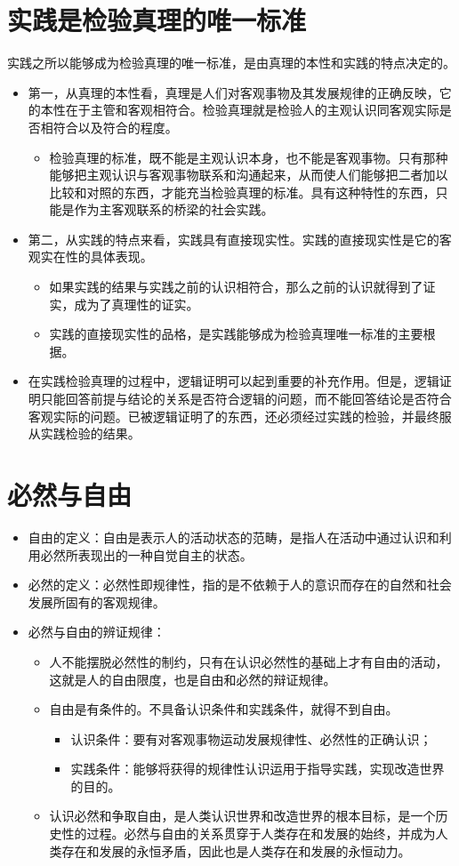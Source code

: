 \documentclass[12pt,openany]{ctexbook}
\begin{document}
\section{实践是检验真理的唯一标准}
实践之所以能够成为检验真理的唯一标准，是由真理的本性和实践的特点决定的。
\begin{itemize}
  \item 第一，从真理的本性看，真理是人们对客观事物及其发展规律的正确反映，它的本性在于主管和客观相符合。检验真理就是检验人的主观认识同客观实际是否相符合以及符合的程度。
\begin{itemize}
  \item 检验真理的标准，既不能是主观认识本身，也不能是客观事物。只有那种能够把主观认识与客观事物联系和沟通起来，从而使人们能够把二者加以比较和对照的东西，才能充当检验真理的标准。具有这种特性的东西，只能是作为主客观联系的桥梁的社会实践。
\end{itemize}
  \item 第二，从实践的特点来看，实践具有直接现实性。实践的直接现实性是它的客观实在性的具体表现。
\begin{itemize}
  \item 如果实践的结果与实践之前的认识相符合，那么之前的认识就得到了证实，成为了真理性的证实。
  \item 实践的直接现实性的品格，是实践能够成为检验真理唯一标准的主要根据。
\end{itemize}
  \item 在实践检验真理的过程中，逻辑证明可以起到重要的补充作用。但是，逻辑证明只能回答前提与结论的关系是否符合逻辑的问题，而不能回答结论是否符合客观实际的问题。已被逻辑证明了的东西，还必须经过实践的检验，并最终服从实践检验的结果。
\end{itemize}
\section{必然与自由}
\begin{itemize}
  \item 自由的定义：自由是表示人的活动状态的范畴，是指人在活动中通过认识和利用必然所表现出的一种自觉自主的状态。
  \item 必然的定义：必然性即规律性，指的是不依赖于人的意识而存在的自然和社会发展所固有的客观规律。
  \item 必然与自由的辨证规律：
\begin{itemize}
  \item 人不能摆脱必然性的制约，只有在认识必然性的基础上才有自由的活动，这就是人的自由限度，也是自由和必然的辩证规律。
  \item 自由是有条件的。不具备认识条件和实践条件，就得不到自由。
\begin{itemize}
  \item 认识条件：要有对客观事物运动发展规律性、必然性的正确认识；
  \item 实践条件：能够将获得的规律性认识运用于指导实践，实现改造世界的目的。
\end{itemize}
  \item 认识必然和争取自由，是人类认识世界和改造世界的根本目标，是一个历史性的过程。必然与自由的关系贯穿于人类存在和发展的始终，并成为人类存在和发展的永恒矛盾，因此也是人类存在和发展的永恒动力。
\end{itemize}
\end{itemize}
\end{document}
